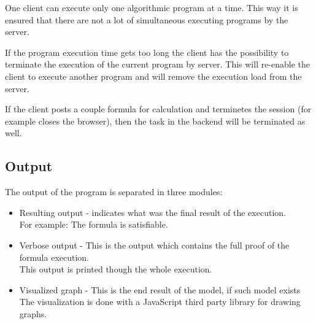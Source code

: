 \documentclass{article}
\begin{document}
		One client can execute only one algorithmic program at a time. 
		This way it is ensured that there are not a lot of simultaneous executing programs by the server.
		
		If the program execution time gets too long the client has the possibility to terminate the execution 
		of the current program by server. This will re-enable the client to execute another program and will remove 
		the execution load from the server.

		If the client posts a couple formula for calculation and terminetes the session (for example closes the browser),
		then the task in the backend will be terminated as well.

		\subsection*{Output}
		The output of the program is separated in three modules:
		\begin{itemize}
			\item Resulting output - indicates what was the final result of the execution. \\
				For example: The formula is satisfiable.
			\item Verbose output - This is the output which contains the full proof of the formula execution. \\
				This output is printed though the whole execution.
			\item Visualized graph - This is the end result of the model, if such model exists \\
				The visualization is done with a JavaScript third party library for drawing graphs.
		\end{itemize}
\end{document}
